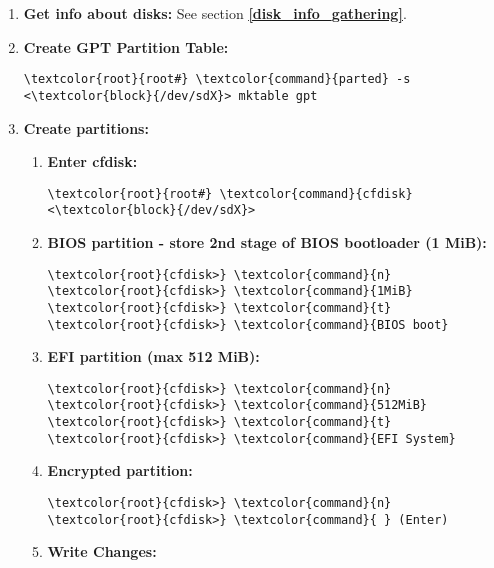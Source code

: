 \documentclass[10pt, a4paper, onecolumn, openany]{book} %
\begin{document}
\begin{enumerate}
    \item \textbf{Get info about disks:}
\newline See section \underline{\textbf{\ref{disk_info_gathering}}}.

    \item \textbf{Create GPT Partition Table:}
\begin{Verbatim}[commandchars=\\\{\}]
\textcolor{root}{root#} \textcolor{command}{parted} -s <\textcolor{block}{/dev/sdX}> mktable gpt
\end{Verbatim}

    \item \textbf{Create partitions:}
    \begin{enumerate}
        \item \textbf{Enter cfdisk:}
\begin{Verbatim}[commandchars=\\\{\}]
\textcolor{root}{root#} \textcolor{command}{cfdisk} <\textcolor{block}{/dev/sdX}>
\end{Verbatim}
        \item \textbf{BIOS partition - store 2nd stage of BIOS bootloader (1 MiB):}
\begin{Verbatim}[commandchars=\\\{\}]
\textcolor{root}{cfdisk>} \textcolor{command}{n}
\textcolor{root}{cfdisk>} \textcolor{command}{1MiB}
\textcolor{root}{cfdisk>} \textcolor{command}{t}
\textcolor{root}{cfdisk>} \textcolor{command}{BIOS boot}
\end{Verbatim}
        \item \textbf{EFI partition (max 512 MiB):}
\begin{Verbatim}[commandchars=\\\{\}]
\textcolor{root}{cfdisk>} \textcolor{command}{n}
\textcolor{root}{cfdisk>} \textcolor{command}{512MiB}
\textcolor{root}{cfdisk>} \textcolor{command}{t}
\textcolor{root}{cfdisk>} \textcolor{command}{EFI System}
\end{Verbatim}
        \item \textbf{Encrypted partition:}
\begin{Verbatim}[commandchars=\\\{\}]
\textcolor{root}{cfdisk>} \textcolor{command}{n}
\textcolor{root}{cfdisk>} \textcolor{command}{ } (Enter)
\end{Verbatim}        
        \item \textbf{Write Changes:}
\begin{Verbatim}[commandchars=\\\{\}]

\end{Verbatim}
\end{enumerate}
\end{enumerate}
\end{document}
